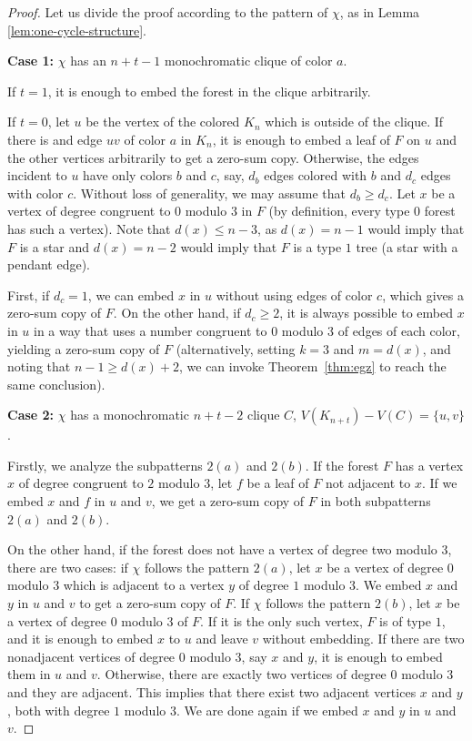 \documentclass[11pt]{article}
\begin{document}
\begin{proof}
    Let us divide the proof according to the pattern of $\chi$, as in Lemma \ref{lem:one-cycle-structure}.

    \medskip

    \textbf{Case 1:} $\chi$ has an $n+t-1$ monochromatic clique of color $a$.

    If $t=1$, it is enough to embed the forest in the clique arbitrarily. 
    
    If $t=0$, let $u$ be the vertex of the colored $K_n$ which is outside of the clique. If there is and edge $uv$ of color $a$ in $K_n$, it is enough to embed a leaf of $F$ on $u$ and the other vertices arbitrarily to get a zero-sum copy. Otherwise, the edges incident to $u$ have only colors $b$ and $c$, say, $d_b$ edges colored with $b$ and $d_c$ edges with color $c$. Without loss of generality, we may assume that $d_b \geq d_c$. Let $x$ be a vertex of degree congruent to $0$ modulo $3$ in $F$ (by definition, every type $0$ forest has such a vertex). Note that $d(x) \leq n-3$, as $d(x)=n-1$ would imply that $F$ is a star and $d(x)=n-2$ would imply that $F$ is a type $1$ tree (a star with a pendant edge).
    
    First, if $d_c = 1$, we can embed $x$ in $u$ without using edges of color $c$, which gives a zero-sum copy of $F$. On the other hand, if $d_c \geq 2$, it is always possible to embed $x$ in $u$ in a way that uses a number congruent to $0$ modulo $3$ of edges of each color, yielding a zero-sum copy of $F$ (alternatively, setting \( k = 3 \) and \( m = d(x) \), and noting that \( n - 1 \geq d(x) + 2 \), we can invoke Theorem~\ref{thm:egz} to reach the same conclusion).
    \medskip
    
    \textbf{Case 2:} $\chi$ has a monochromatic $n+t-2$ clique $C$, $V(K_{n+t})-V(C)=\{u,v\}$.

Firstly, we analyze the subpatterns \( 2(a) \) and \( 2(b) \). If the forest $F$ has a vertex $x$ of degree congruent to $2$ modulo $3$, let $f$ be a leaf of $F$ not adjacent to $x$. If we embed $x$ and $f$ in $u$ and $v$, we get a zero-sum copy of $F$ in both subpatterns $2(a)$ and $2(b)$.
    

    On the other hand, if the forest does not have a vertex of degree two modulo $3$, there are two cases: if $\chi$ follows the pattern $2(a)$, let $x$ be a vertex of degree $0$ modulo $3$ which is adjacent to a vertex $y$ of degree $1$ modulo $3$. We embed $x$ and $y$ in $u$ and $v$ to get a zero-sum copy of $F$. If $\chi$ follows the pattern $2(b)$, let $x$ be a vertex of degree $0$ modulo $3$ of $F$. If it is the only such vertex, $F$ is of type $1$, and it is enough to embed $x$ to $u$ and leave $v$ without embedding. If there are two nonadjacent vertices of degree $0$ modulo $3$, say $x$ and $y$, it is enough to embed them in $u$ and $v$. Otherwise, there are exactly two vertices of degree $0$ modulo $3$ and they are adjacent. This implies that there exist two adjacent vertices $x$ and $y$, both with degree $1$ modulo $3$. We are done again if we embed $x$ and $y$ in $u$ and $v$.   
    

\end{proof}
\end{document}
